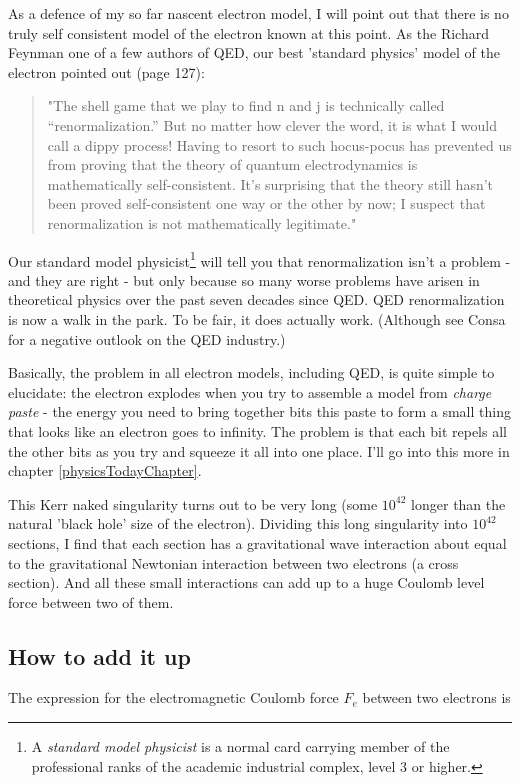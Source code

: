 \documentclass[../rzero]{subfiles}
\begin{document}
As a defence of my so far nascent electron model, I will point out that there is no truly self consistent model of the electron known at this point. As the Richard Feynman one of a few authors of QED, our best 'standard physics' model of the electron pointed out\cite{Feynman1985} (page 127): 

\begin{quotation}
"The shell game that we play to find n and j is technically called “renormalization.” But no matter how clever the word, it is what I would call a dippy process! Having to resort to such hocus-pocus has prevented us from proving that the theory of quantum electrodynamics is mathematically self-consistent. It's surprising that the theory still hasn't been proved self-consistent one way or the other by now; I suspect that renormalization is not mathematically legitimate." 
\end{quotation}

Our standard model physicist\footnote{A \textit{standard model physicist} is a normal card carrying member of the professional ranks of the academic industrial complex, level 3 or higher.} will tell you that renormalization isn't a problem - and they are right - but only because so many worse problems have arisen in theoretical physics over the past seven decades since QED\cite{feynmanSpaceTimeApproachQuantum1949}. QED renormalization is now a walk in the park. To be fair, it does actually work. (Although see Consa\cite{Cioletti2006} for a negative outlook on the QED industry.)

Basically, the problem in all electron models, including QED, is quite simple to elucidate: the electron explodes when you try to assemble a model from \textit{charge paste} - the energy you need to bring together bits this paste to form a small thing that looks like an electron goes to infinity. The problem is that each bit repels all the other bits as you try and squeeze it all into one place. I'll go into this more in chapter \ref{physicsTodayChapter}.  

This Kerr naked singularity turns out to be very long (some $10^{42}$ longer than the natural 'black hole' size of the electron). Dividing this long singularity into  $10^{42}$ sections, I find that each section has a gravitational wave interaction about equal to the gravitational Newtonian interaction between two electrons (a cross section). And all these small interactions can add up to a huge Coulomb level force between two of them.  

\subsection{How to add it up}
The expression for the electromagnetic Coulomb force $F_e$ between two electrons is 
\end{document}
